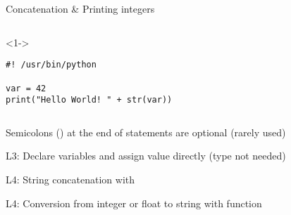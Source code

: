 \begin{frame}[fragile]{Concatenation \& Printing integers}

  \begin{columns}[onlytextwidth]
    \begin{column}{\textwidth}
      \begin{onlyenv}<1->
        \begin{lstlisting}[style=python]
#! /usr/bin/python

var = 42
print("Hello World! " + str(var)) \end{lstlisting}
      \end{onlyenv}
    \end{column}
  \end{columns}

   Semicolons (\TTBF{;}) at the end of statements are optional (rarely used)

   L3: Declare variables and assign value directly (type not needed)

   L4: String concatenation with \TTBF{+}

   L4: Conversion from integer or float to string with  function

\end{frame}



